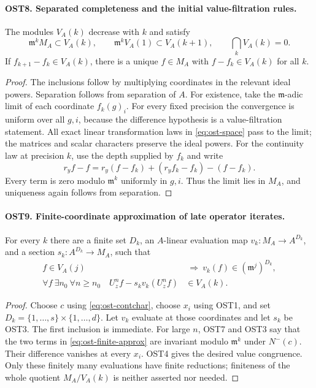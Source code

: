 \paragraph{OST8. Separated completeness and the initial value-filtration rules.}
\label{claim:OST8}
The modules $V_A(k)$ decrease with $k$ and satisfy
\[
 \mathfrak m^kM_A\subset V_A(k),\qquad
 \mathfrak m^kV_A(1)\subset V_A(k+1),\qquad
 \bigcap_kV_A(k)=0.
\]
If $f_{k+1}-f_k\in V_A(k)$, there is a unique $f\in M_A$
with $f-f_k\in V_A(k)$ for all $k$.
\begin{proof}
The inclusions follow by multiplying coordinates in the relevant
ideal powers.  Separation follows from separation of $A$.
For existence, take the $\mathfrak m$-adic limit of each
coordinate $f_k(g)_i$.  For every fixed precision the convergence
is uniform over all $g,i$, because the difference hypothesis is
a value-filtration statement.  All exact linear transformation
laws in \eqref{eq:ost-space} pass to the limit; the matrices and
scalar characters preserve the ideal powers.  For the continuity
law at precision $k$, use the depth supplied by $f_k$ and write
\[
 r_yf-f=r_y(f-f_k)+(r_yf_k-f_k)-(f-f_k).
\]
Every term is zero modulo $\mathfrak m^k$ uniformly in $g,i$.
Thus the limit lies in $M_A$, and uniqueness again follows
from separation.
\end{proof}

\paragraph{OST9. Finite-coordinate approximation of late operator iterates.}
\label{claim:OST9}
For every $k$ there are a finite set $D_k$, an $A$-linear
evaluation map $v_k:M_A\to A^{D_k}$, and a section
$s_k:A^{D_k}\to M_A$, such that
\begin{align}
 f\in V_A(j)&\ \Longrightarrow\ v_k(f)\in(\mathfrak m^j)^{D_k},
 \label{eq:ost-evaluation-filtration}\\
 \forall f\ \exists n_0\ \forall n\geq n_0\quad
 U_z^nf-s_kv_k(U_z^nf)&\in V_A(k).
 \label{eq:ost-finite-approx}
\end{align}
\begin{proof}
Choose $c$ using \eqref{eq:ost-contchar}, choose $x_i$ using
OST1, and set $D_k=\{1,\ldots,s\}\times\{1,\ldots,d\}$.
Let $v_k$ evaluate at those coordinates and let $s_k$ be OST3.
The first inclusion is immediate.  For large $n$, OST7 and
OST3 say that the two terms in \eqref{eq:ost-finite-approx}
are invariant modulo $\mathfrak m^k$ under $N^-(c)$.
Their difference vanishes at every $x_i$.  OST4 gives the
desired value congruence.  Only these finitely many evaluations
have finite reductions; finiteness of the whole quotient
$M_A/V_A(k)$ is neither asserted nor needed.
\end{proof}

